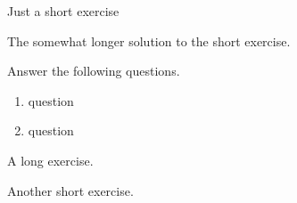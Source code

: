 \documentclass{article}
\begin{document}
\begin{exercise}[level=hard,short]
  Just a short exercise
\end{exercise}
\begin{solution}
  The somewhat longer solution to the short exercise. \lipsum[1]
\end{solution}

\begin{exercise}[subtitle=This one has a title,level=easy]
  Answer the following questions.
  \begin{enumerate}
    \item question 
    \item question 
  \end{enumerate}
\end{exercise}

\begin{exercise}
  A long exercise. \lipsum[4]
\end{exercise}

\begin{exercise}[level=medium,short]
  Another short exercise.
\end{exercise}
\end{document}
